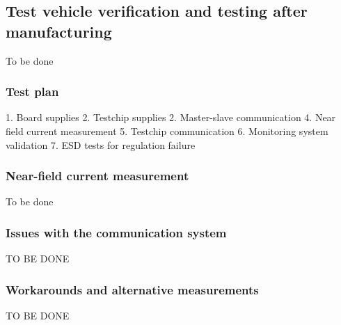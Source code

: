 \subsection{Test vehicle verification and testing after manufacturing}
\label{sec:test-vehicle-testing}

To be done

\subsubsection{Test plan}

1. Board supplies
2. Testchip supplies
2. Master-slave communication
4. Near field current measurement
5. Testchip communication
6. Monitoring system validation
7. ESD tests for regulation failure

\subsubsection{Near-field current measurement}

To be done

\subsubsection{Issues with the communication system}

TO BE DONE

\subsubsection{Workarounds and alternative measurements}

TO BE DONE
